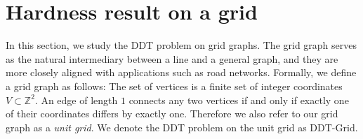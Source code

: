 \section{Hardness result on a grid}
\label{npgrid}
% 

In this section, we study the DDT problem on grid graphs. The grid graph serves as the natural intermediary between a line and a general graph, and they are more closely aligned with applications such as road networks.  Formally, we define a grid graph as follows: The set of vertices is a finite set of integer coordinates $V \subset \mathbb{Z}^2$. 
An edge of length $1$ connects any two vertices if and only if exactly one of their coordinates differs by exactly one. Therefore we also refer to our grid graph as a \emph{unit grid}. We denote the DDT problem on the unit grid as DDT-Grid. %





